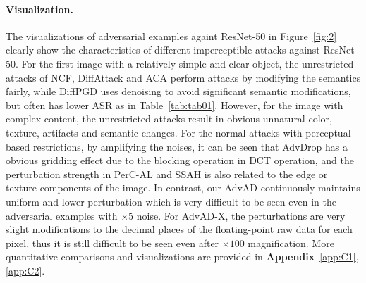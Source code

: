 \documentclass{article}
\begin{document}
\paragraph{Visualization.}
The visualizations of adversarial examples againt ResNet-50 in Figure~\ref{fig:2} clearly show the characteristics of different imperceptible attacks against ResNet-50. For the first image with a relatively simple and clear object, the unrestricted attacks of NCF, DiffAttack and ACA perform attacks by modifying the semantics fairly, while 
DiffPGD uses denoising to avoid significant semantic modifications, but often has lower ASR as in Table~\ref{tab:tab01}.
However, for the image with complex content, the unrestricted attacks result in obvious unnatural color, texture, artifacts and semantic changes. For the normal attacks with perceptual-based restrictions, by amplifying the noises, it can be seen that AdvDrop has a obvious gridding effect due to the blocking operation in DCT operation, and the perturbation strength in PerC-AL and SSAH is also related to the edge or texture components of the image. In contrast, our AdvAD continuously maintains uniform and lower  perturbation which is very difficult to be seen even in the adversarial examples with $\times5$ noise. For AdvAD-X, the perturbations are very slight modifications to the decimal places of the floating-point  raw data for each pixel, thus it is still difficult to be seen even after $\times100$ magnification. More quantitative comparisons and visualizations are provided in \textbf{Appendix}~\ref{app:C1}, \ref{app:C2}.
\end{document}
